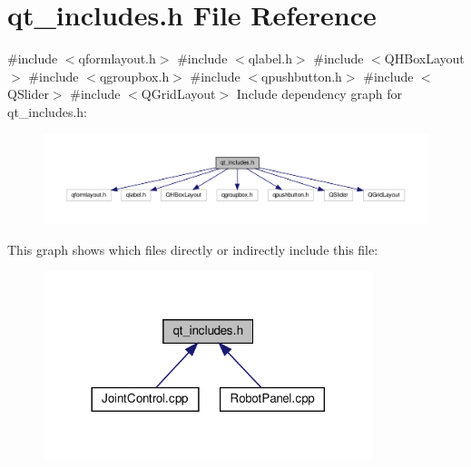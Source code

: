 \section{qt\+\_\+includes.\+h File Reference}
\label{qt__includes_8h}
{\ttfamily \#include $<$qformlayout.\+h$>$}\newline
{\ttfamily \#include $<$qlabel.\+h$>$}\newline
{\ttfamily \#include $<$Q\+H\+Box\+Layout$>$}\newline
{\ttfamily \#include $<$qgroupbox.\+h$>$}\newline
{\ttfamily \#include $<$qpushbutton.\+h$>$}\newline
{\ttfamily \#include $<$Q\+Slider$>$}\newline
{\ttfamily \#include $<$Q\+Grid\+Layout$>$}\newline
Include dependency graph for qt\+\_\+includes.\+h\+:
\nopagebreak
\begin{figure}[H]
\begin{center}
\leavevmode
\includegraphics[width=350pt]{qt__includes_8h__incl}
\end{center}
\end{figure}
This graph shows which files directly or indirectly include this file\+:
\nopagebreak
\begin{figure}[H]
\begin{center}
\leavevmode
\includegraphics[width=272pt]{qt__includes_8h__dep__incl}
\end{center}
\end{figure}
